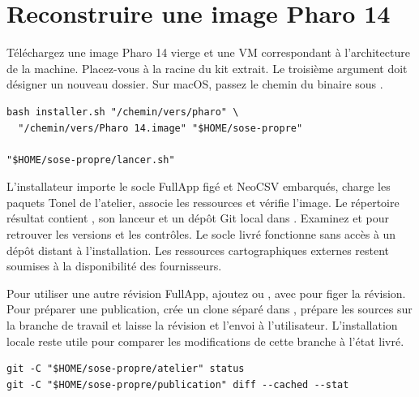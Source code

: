 \section{Reconstruire une image Pharo 14}
Téléchargez une image Pharo 14 vierge et une VM correspondant à l'architecture de la machine. Placez-vous à la racine du kit extrait. Le troisième argument doit désigner un nouveau dossier. Sur macOS, passez le chemin du binaire  sous .

\begin{lstlisting}
bash installer.sh "/chemin/vers/pharo" \
  "/chemin/vers/Pharo 14.image" "$HOME/sose-propre"

"$HOME/sose-propre/lancer.sh"
\end{lstlisting}

L'installateur importe le socle FullApp figé et NeoCSV embarqués, charge les paquets Tonel de l'atelier, associe les ressources et vérifie l'image. Le répertoire résultat contient , son lanceur et un dépôt Git local dans . Examinez  et  pour retrouver les versions et les contrôles. Le socle livré fonctionne sans accès à un dépôt distant à l'installation. Les ressources cartographiques externes restent soumises à la disponibilité des fournisseurs.

Pour utiliser une autre révision FullApp, ajoutez  ou , avec  pour figer la révision. Pour préparer une publication,  crée un clone séparé dans , prépare les sources sur la branche de travail  et laisse la révision et l'envoi à l'utilisateur. L'installation locale reste utile pour comparer les modifications de cette branche à l'état livré.

\begin{lstlisting}
git -C "$HOME/sose-propre/atelier" status
git -C "$HOME/sose-propre/publication" diff --cached --stat
\end{lstlisting}

